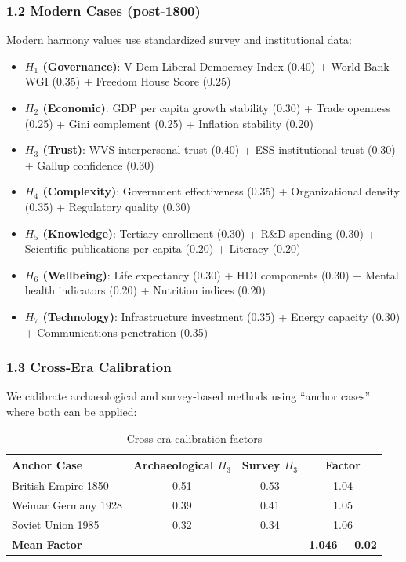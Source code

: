 \documentclass[11pt,a4paper]{article}
\newcommand{\Hone}{H_1}
\newcommand{\Htwo}{H_2}
\newcommand{\Hthree}{H_3}
\newcommand{\Hfour}{H_4}
\newcommand{\Hfive}{H_5}
\newcommand{\Hsix}{H_6}
\newcommand{\Hseven}{H_7}
\begin{document}
\subsubsection{1.2 Modern Cases (post-1800)}

Modern harmony values use standardized survey and institutional data:

\begin{itemize}
\item \textbf{$\Hone$ (Governance)}: V-Dem Liberal Democracy Index (0.40) + World Bank WGI (0.35) + Freedom House Score (0.25)
\item \textbf{$\Htwo$ (Economic)}: GDP per capita growth stability (0.30) + Trade openness (0.25) + Gini complement (0.25) + Inflation stability (0.20)
\item \textbf{$\Hthree$ (Trust)}: WVS interpersonal trust (0.40) + ESS institutional trust (0.30) + Gallup confidence (0.30)
\item \textbf{$\Hfour$ (Complexity)}: Government effectiveness (0.35) + Organizational density (0.35) + Regulatory quality (0.30)
\item \textbf{$\Hfive$ (Knowledge)}: Tertiary enrollment (0.30) + R\&D spending (0.30) + Scientific publications per capita (0.20) + Literacy (0.20)
\item \textbf{$\Hsix$ (Wellbeing)}: Life expectancy (0.30) + HDI components (0.30) + Mental health indicators (0.20) + Nutrition indices (0.20)
\item \textbf{$\Hseven$ (Technology)}: Infrastructure investment (0.35) + Energy capacity (0.30) + Communications penetration (0.35)
\end{itemize}

\subsubsection{1.3 Cross-Era Calibration}

We calibrate archaeological and survey-based methods using ``anchor cases'' where both can be applied:

\begin{table}[H]
\centering
\caption{Cross-era calibration factors}
\begin{tabular}{lccc}
\toprule
\textbf{Anchor Case} & \textbf{Archaeological $\Hthree$} & \textbf{Survey $\Hthree$} & \textbf{Factor} \\
\midrule
British Empire 1850 & 0.51 & 0.53 & 1.04 \\
Weimar Germany 1928 & 0.39 & 0.41 & 1.05 \\
Soviet Union 1985 & 0.32 & 0.34 & 1.06 \\
\midrule
\textbf{Mean Factor} & & & \textbf{1.046 $\pm$ 0.02} \\
\bottomrule
\end{tabular}
\end{table}
\end{document}
